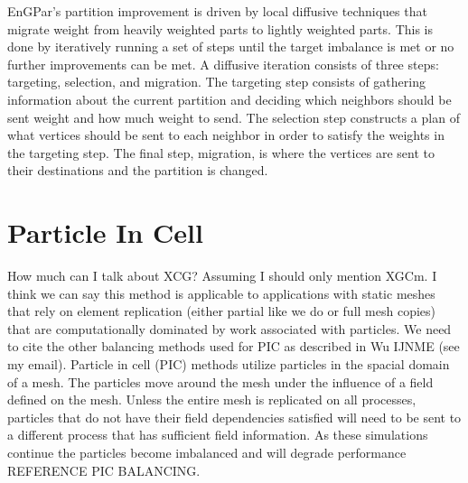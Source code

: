 \documentclass[conference]{IEEEtran}
\begin{document}
EnGPar's partition improvement is driven by local diffusive techniques that migrate weight
from heavily weighted parts to lightly weighted parts. This is done by iteratively running
a set of steps until the target imbalance is met or no further improvements can be met.
A diffusive iteration consists of three steps: targeting, selection, and migration.
The targeting step consists of gathering information about the current partition and deciding
which neighbors should be sent weight and how much weight to send. The selection step constructs
a plan of what vertices should be sent to each neighbor in order to satisfy the weights in
the targeting step. The final step, migration, is where the vertices are sent to their
destinations and the partition is changed.

\section{Particle In Cell}


{\color{red} How much can I talk about XCG? Assuming I should only mention XGCm.
I think we can say this method is applicable to applications with static meshes
that rely on element replication (either partial like we do or full mesh copies)
that are computationally dominated by work associated with particles.  We need
to cite the other balancing methods used for PIC as described in Wu IJNME (see
my email).}
Particle in cell (PIC) methods utilize particles in the spacial domain of a
mesh.
The particles move around the mesh under the influence of a field defined on the
mesh.
Unless the entire mesh is replicated on all processes, particles that do not
have their field dependencies satisfied will need to be
sent to a different process that has sufficient field information.
As these simulations continue the particles become imbalanced and will degrade
performance{\color{red} REFERENCE PIC BALANCING}.
\end{document}
